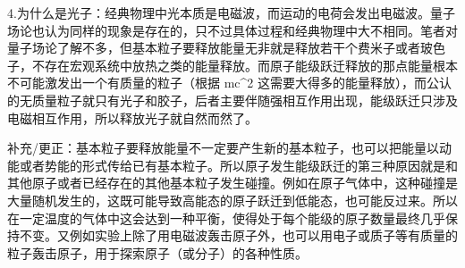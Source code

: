 \begin{itemize}
4.为什么是光子：经典物理中光本质是电磁波，而运动的电荷会发出电磁波。量子场论也认为同样的现象是存在的，只不过具体过程和经典物理中大不相同。笔者对量子场论了解不多，但基本粒子要释放能量无非就是释放若干个费米子或者玻色子，不存在宏观系统中放热之类的能量释放。而原子能级跃迁释放的那点能量根本不可能激发出一个有质量的粒子（根据 mc^2 这需要大得多的能量释放），而公认的无质量粒子就只有光子和胶子，后者主要伴随强相互作用出现，能级跃迁只涉及电磁相互作用，所以释放光子就自然而然了。

补充/更正：基本粒子要释放能量不一定要产生新的基本粒子，也可以把能量以动能或者势能的形式传给已有基本粒子。所以原子发生能级跃迁的第三种原因就是和其他原子或者已经存在的其他基本粒子发生碰撞。例如在原子气体中，这种碰撞是大量随机发生的，这既可能导致高能态的原子跃迁到低能态，也可能反过来。所以在一定温度的气体中这会达到一种平衡，使得处于每个能级的原子数量最终几乎保持不变。又例如实验上除了用电磁波轰击原子外，也可以用电子或质子等有质量的粒子轰击原子，用于探索原子（或分子）的各种性质。


\end{itemize}
